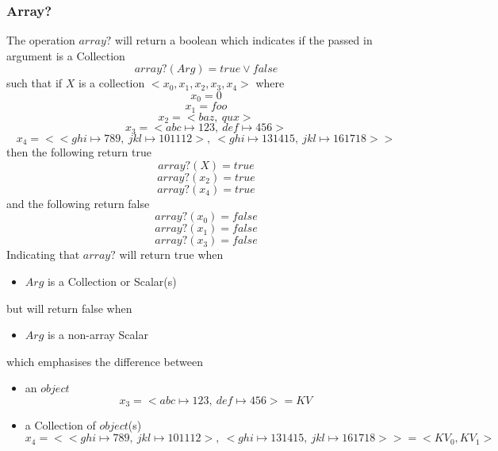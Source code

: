 \documentclass[../main.tex]{subfiles}
\begin{document}
\subsubsection{Array?}

The operation $array?$ will return a boolean which indicates if the passed in argument is a Collection
$$array?(Arg) = true \lor false$$
such that if $X$ is a collection $<x_{0}, x_{1}, x_{2}, x_{3}, x_{4}>$
where
$$x_{0} = 0$$
$$x_{1} = foo$$
$$x_{2} = <baz, \ qux>$$
$$x_{3} = <abc \mapsto 123, \ def \mapsto 456>$$
$$x_{4} = <<ghi \mapsto 789, \ jkl \mapsto 101112>, \ <ghi \mapsto 131415, \ jkl \mapsto 161718>>$$
then the following return true
$$array?(X) = true$$
$$array?(x_{2}) = true$$
$$array?(x_{4}) = true$$
and the following return false
$$array?(x_{0}) = false$$
$$array?(x_{1}) = false$$
$$array?(x_{3}) = false$$
Indicating that $array?$ will return true when
\begin{itemize}
 \item $Arg$ is a Collection or Scalar(s)
\end{itemize}
but will return false when
\begin{itemize}
 \item $Arg$ is a non-array Scalar
\end{itemize}
which emphasises the difference between
\begin{itemize}
\item an $object$
  $$x_{3} = <abc \mapsto 123, \ def \mapsto 456> = KV$$
\item a Collection of $object$(s)
  $$x_{4} = <<ghi \mapsto 789, \ jkl \mapsto 101112>, \ <ghi \mapsto 131415, \ jkl \mapsto 161718>> = <KV_{0}, KV_{1}>$$
\end{itemize}
\end{document}
